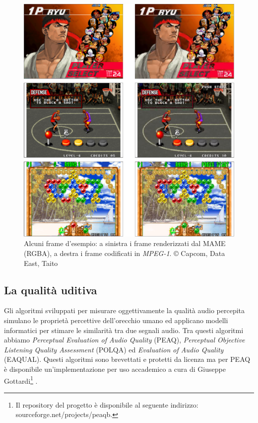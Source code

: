\begin{figure}[H]
	\centering
	\includegraphics[width=\linewidth]{immagini/BMP_MPEG_compare}
	\caption{Alcuni frame d'esempio: a sinistra i frame renderizzati dal MAME (RGBA), a destra i frame codificati in \textit{MPEG-1}. © Capcom, Data East, Taito}
	\label{fig:BMP_MPEG_compare}
\end{figure}



\subsection{La qualità uditiva}
Gli algoritmi sviluppati per misurare oggettivamente la qualità audio percepita simulano le proprietà percettive dell'orecchio umano ed applicano modelli informatici per stimare le similarità tra due segnali audio. Tra questi algoritmi abbiamo \textit{Perceptual Evaluation of Audio Quality} (PEAQ), \textit{Perceptual Objective Listening Quality Assessment} (POLQA) ed \textit{Evaluation of Audio Quality} (EAQUAL). Questi algoritmi sono brevettati e protetti da licenza ma per PEAQ è disponibile un'implementazione per uso accademico a cura di Giuseppe Gottardi\footnote{Il repository del progetto è disponibile al seguente indirizzo: sourceforge.net/projects/peaqb.} \parencite{PoctaPeter2015SaOA}.



